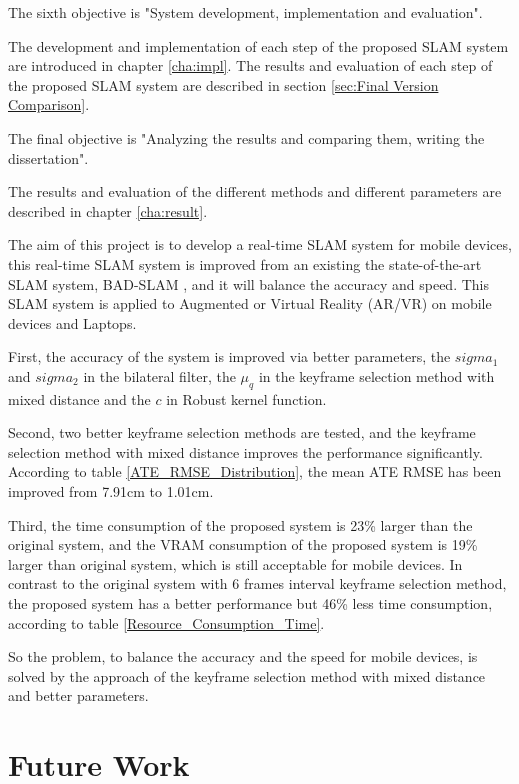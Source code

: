 The sixth objective is "System development, implementation and evaluation".

The development and implementation of each step of the proposed SLAM system are introduced in chapter \ref{cha:impl}. The results and evaluation of each step of the proposed SLAM system are described in section \ref{sec:Final Version Comparison}.

The final objective is "Analyzing the results and comparing them, writing the dissertation".

The results and evaluation of the different methods and different parameters are described in chapter \ref{cha:result}.

The aim of this project is to develop a real-time \ac{SLAM} system for mobile devices, this real-time SLAM system is improved from an existing the state-of-the-art SLAM system, BAD-SLAM \parencite{8954208}, and it will balance the accuracy and speed. This \ac{SLAM} system is applied to Augmented or Virtual Reality (AR/VR) on mobile devices and Laptops.

First, the accuracy of the system is improved via better parameters, the $sigma_1$ and $sigma_2$ in the bilateral filter, the $\mu_q$ in the keyframe selection method with mixed distance and the $c$ in Robust kernel function.

Second, two better keyframe selection methods are tested, and the keyframe selection method with mixed distance improves the performance significantly. According to table \ref{ATE_RMSE_Distribution}, the mean ATE RMSE has been improved from 7.91cm to 1.01cm.

Third, the time consumption of the proposed system is 23\% larger than the original system, and the VRAM consumption of the proposed system is 19\% larger than original system, which is still acceptable for mobile devices. In contrast to the original system with 6 frames interval keyframe selection method, the proposed system has a better performance but 46\% less time consumption, according to table \ref{Resource_Consumption_Time}.

So the problem, to balance the accuracy and the speed for mobile devices, is solved by the approach of the keyframe selection method with mixed distance and better parameters.

\section{Future Work}
\label{sec:Further_Work}

